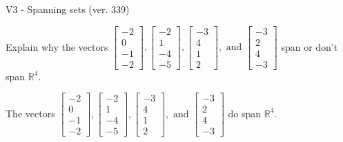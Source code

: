 \begin{exercise}
  \begin{exerciseTitle}V3 - Spanning sets (ver. 339)\end{exerciseTitle}
  \begin{exerciseStatement}
    Explain why the vectors \(\left[\begin{array}{r}
-2 \\
0 \\
-1 \\
-2
\end{array}\right] , \left[\begin{array}{r}
-2 \\
1 \\
-4 \\
-5
\end{array}\right] , \left[\begin{array}{r}
-3 \\
4 \\
1 \\
2
\end{array}\right] , \text{ and } \left[\begin{array}{r}
-3 \\
2 \\
4 \\
-3
\end{array}\right]\) span or don't span \(\mathbb{R}^4\). 
	


  \end{exerciseStatement}
  \begin{exerciseAnswer}
   The vectors \(\left[\begin{array}{r}
-2 \\
0 \\
-1 \\
-2
\end{array}\right] , \left[\begin{array}{r}
-2 \\
1 \\
-4 \\
-5
\end{array}\right] , \left[\begin{array}{r}
-3 \\
4 \\
1 \\
2
\end{array}\right] , \text{ and } \left[\begin{array}{r}
-3 \\
2 \\
4 \\
-3
\end{array}\right]\) 
  	 do  
	span \(\mathbb{R}^4\).
  


  \end{exerciseAnswer}
\end{exercise}